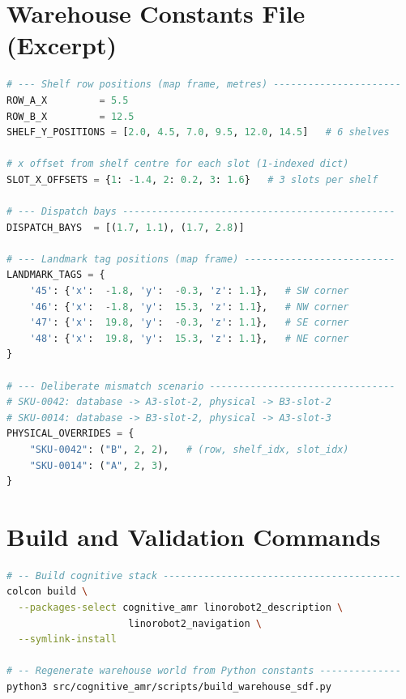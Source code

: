 \documentclass[12pt,a4paper]{report}
\begin{document}
\begin{appendices}

\chapter{Warehouse Constants File (Excerpt)}
\label{app:constants}

\begin{lstlisting}[language=Python, caption={Key entries from warehouse\_constants.py.}]
# --- Shelf row positions (map frame, metres) ----------------------
ROW_A_X         = 5.5
ROW_B_X         = 12.5
SHELF_Y_POSITIONS = [2.0, 4.5, 7.0, 9.5, 12.0, 14.5]   # 6 shelves

# x offset from shelf centre for each slot (1-indexed dict)
SLOT_X_OFFSETS = {1: -1.4, 2: 0.2, 3: 1.6}   # 3 slots per shelf

# --- Dispatch bays -----------------------------------------------
DISPATCH_BAYS  = [(1.7, 1.1), (1.7, 2.8)]

# --- Landmark tag positions (map frame) --------------------------
LANDMARK_TAGS = {
    '45': {'x':  -1.8, 'y':  -0.3, 'z': 1.1},   # SW corner
    '46': {'x':  -1.8, 'y':  15.3, 'z': 1.1},   # NW corner
    '47': {'x':  19.8, 'y':  -0.3, 'z': 1.1},   # SE corner
    '48': {'x':  19.8, 'y':  15.3, 'z': 1.1},   # NE corner
}

# --- Deliberate mismatch scenario --------------------------------
# SKU-0042: database -> A3-slot-2, physical -> B3-slot-2
# SKU-0014: database -> B3-slot-2, physical -> A3-slot-3
PHYSICAL_OVERRIDES = {
    "SKU-0042": ("B", 2, 2),   # (row, shelf_idx, slot_idx)
    "SKU-0014": ("A", 2, 3),
}
\end{lstlisting}

\chapter{Build and Validation Commands}
\label{app:build}

\begin{lstlisting}[language=bash, caption={Standard build and validation workflow.}]
# -- Build cognitive stack -----------------------------------------
colcon build \
  --packages-select cognitive_amr linorobot2_description \
                     linorobot2_navigation \
  --symlink-install

# -- Regenerate warehouse world from Python constants --------------
python3 src/cognitive_amr/scripts/build_warehouse_sdf.py


\end{lstlisting}
\end{appendices}
\end{document}
